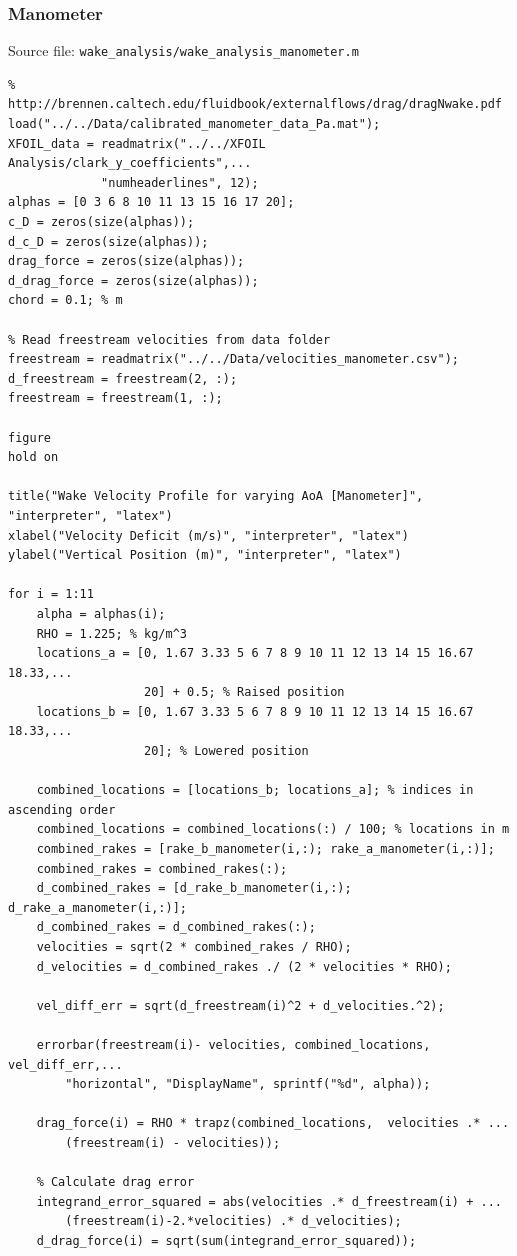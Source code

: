 \documentclass[runningheads]{llncs}
\begin{document}
\subsubsection{Manometer}
Source file: \verb|wake_analysis/wake_analysis_manometer.m|
\begin{verbatim}
% http://brennen.caltech.edu/fluidbook/externalflows/drag/dragNwake.pdf
load("../../Data/calibrated_manometer_data_Pa.mat");
XFOIL_data = readmatrix("../../XFOIL Analysis/clark_y_coefficients",...
             "numheaderlines", 12);
alphas = [0 3 6 8 10 11 13 15 16 17 20];
c_D = zeros(size(alphas));
d_c_D = zeros(size(alphas));
drag_force = zeros(size(alphas));
d_drag_force = zeros(size(alphas));
chord = 0.1; % m

% Read freestream velocities from data folder
freestream = readmatrix("../../Data/velocities_manometer.csv");
d_freestream = freestream(2, :);
freestream = freestream(1, :);

figure
hold on

title("Wake Velocity Profile for varying AoA [Manometer]", "interpreter", "latex")
xlabel("Velocity Deficit (m/s)", "interpreter", "latex")
ylabel("Vertical Position (m)", "interpreter", "latex")

for i = 1:11
    alpha = alphas(i);
    RHO = 1.225; % kg/m^3
    locations_a = [0, 1.67 3.33 5 6 7 8 9 10 11 12 13 14 15 16.67 18.33,...
                   20] + 0.5; % Raised position
    locations_b = [0, 1.67 3.33 5 6 7 8 9 10 11 12 13 14 15 16.67 18.33,...
                   20]; % Lowered position

    combined_locations = [locations_b; locations_a]; % indices in ascending order
    combined_locations = combined_locations(:) / 100; % locations in m
    combined_rakes = [rake_b_manometer(i,:); rake_a_manometer(i,:)];
    combined_rakes = combined_rakes(:);
    d_combined_rakes = [d_rake_b_manometer(i,:); d_rake_a_manometer(i,:)];
    d_combined_rakes = d_combined_rakes(:);
    velocities = sqrt(2 * combined_rakes / RHO);
    d_velocities = d_combined_rakes ./ (2 * velocities * RHO);
    
    vel_diff_err = sqrt(d_freestream(i)^2 + d_velocities.^2);

    errorbar(freestream(i)- velocities, combined_locations, vel_diff_err,...
        "horizontal", "DisplayName", sprintf("%d", alpha));
    
    drag_force(i) = RHO * trapz(combined_locations,  velocities .* ...
        (freestream(i) - velocities));
    
    % Calculate drag error
    integrand_error_squared = abs(velocities .* d_freestream(i) + ...
        (freestream(i)-2.*velocities) .* d_velocities);
    d_drag_force(i) = sqrt(sum(integrand_error_squared));
    

\end{verbatim}
\end{document}
